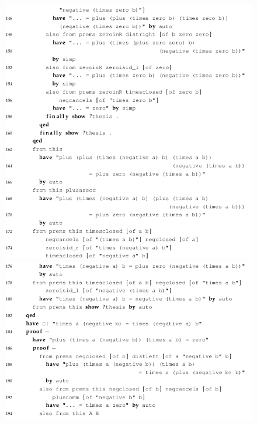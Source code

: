 \begin{figure}[H]
\begin{center}
\includegraphics[scale=0.6]{Figures/Background/ringfull6.png}
\includegraphics[scale=0.6]{Figures/Background/ringfull7.png}
\end{center}
\end{figure}

